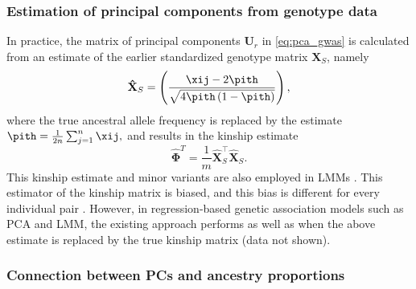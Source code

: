 \documentclass[11pt]{article}
\begin{document}
\subsubsection{Estimation of principal components from genotype data}

In practice, the matrix of principal components $\mathbf{U}_r$ in \cref{eq:pca_gwas} is calculated from an estimate of the earlier standardized genotype matrix $\mathbf{X}_S$, namely
\begin{equation*}
  \mathbf{\hat{X}}_S
  =
  \left(
    \frac{
      \xij - 2 \pith
    }{
      \sqrt{4 \pith \left( 1 - \pith \right)}
    }
  \right)
  ,
\end{equation*}
where the true ancestral allele frequency \pit is replaced by the estimate
$
\pith = \frac{1}{2n} \sum_{j = 1}^n \xij,
$
and results in the kinship estimate
\begin{equation}
  \label{eq:kinship_std}
  \mathbf{\hat{\Phi}}^T
  =
  \frac{1}{m}
  \mathbf{\hat{X}}_S^\intercal
  \mathbf{\hat{X}}_S
  .
\end{equation}
This kinship estimate and minor variants are also employed in LMMs \citep{yang_gcta:_2011}.
This estimator of the kinship matrix is biased, and this bias is different for every individual pair \citep{ochoa_estimating_2021, ochoa_human}.
However, in regression-based genetic association models such as PCA and LMM, the existing approach performs as well as when the above estimate is replaced by the true kinship matrix (data not shown).

\subsubsection{Connection between PCs and ancestry proportions}
\end{document}
